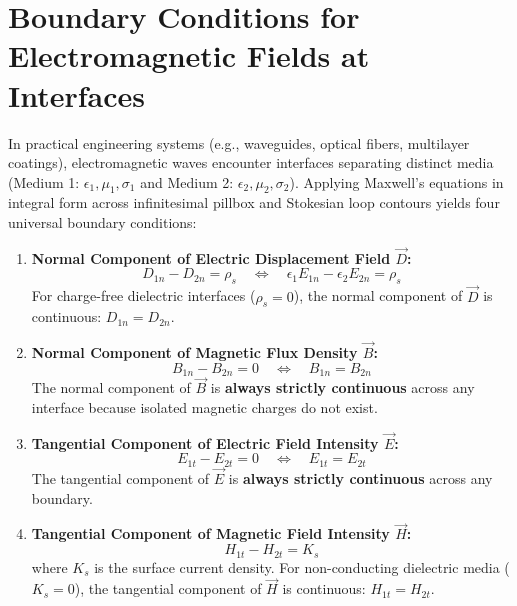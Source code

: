 \section{Boundary Conditions for Electromagnetic Fields at Interfaces}
In practical engineering systems (e.g., waveguides, optical fibers, multilayer coatings), electromagnetic waves encounter interfaces separating distinct media (Medium 1: $\epsilon_1, \mu_1, \sigma_1$ and Medium 2: $\epsilon_2, \mu_2, \sigma_2$). Applying Maxwell's equations in integral form across infinitesimal pillbox and Stokesian loop contours yields four universal boundary conditions:
\begin{enumerate}[leftmargin=*,itemsep=3pt]
    \item \textbf{Normal Component of Electric Displacement Field $\vec{D}$:}
    \begin{equation}
    D_{1n} - D_{2n} = \rho_s \quad \iff \quad \epsilon_1 E_{1n} - \epsilon_2 E_{2n} = \rho_s
    \end{equation}
    For charge-free dielectric interfaces ($\rho_s = 0$), the normal component of $\vec{D}$ is continuous: $D_{1n} = D_{2n}$.
    \item \textbf{Normal Component of Magnetic Flux Density $\vec{B}$:}
    \begin{equation}
    B_{1n} - B_{2n} = 0 \quad \iff \quad B_{1n} = B_{2n}
    \end{equation}
    The normal component of $\vec{B}$ is \textbf{always strictly continuous} across any interface because isolated magnetic charges do not exist.
    \item \textbf{Tangential Component of Electric Field Intensity $\vec{E}$:}
    \begin{equation}
    E_{1t} - E_{2t} = 0 \quad \iff \quad E_{1t} = E_{2t}
    \end{equation}
    The tangential component of $\vec{E}$ is \textbf{always strictly continuous} across any boundary.
    \item \textbf{Tangential Component of Magnetic Field Intensity $\vec{H}$:}
    \begin{equation}
    H_{1t} - H_{2t} = K_s
    \end{equation}
    where $K_s$ is the surface current density. For non-conducting dielectric media ($K_s = 0$), the tangential component of $\vec{H}$ is continuous: $H_{1t} = H_{2t}$.
\end{enumerate}

